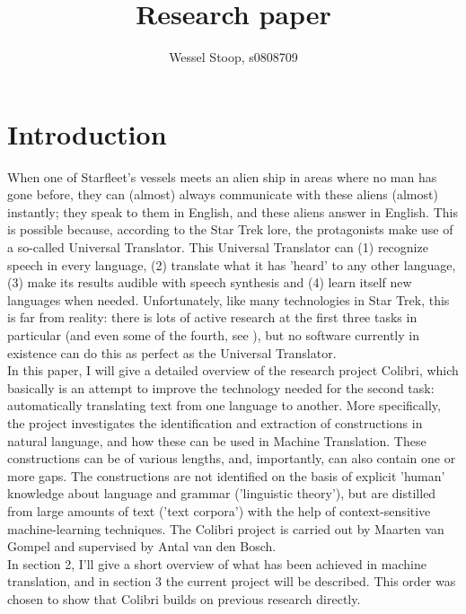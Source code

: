 \documentclass[12pt]{article}
\title{Research paper}
\author{Wessel Stoop, s0808709}
\begin{document}
\maketitle

\section{Introduction}

When one of Starfleet's vessels meets an alien ship in areas where no man has gone before, they can (almost) always communicate with these aliens (almost) instantly; they speak to them in English, and these aliens answer in English. This is possible because, according to the Star Trek lore, the protagonists make use of a so-called Universal Translator. This Universal Translator can (1) recognize speech in every language, (2) translate what it has 'heard' to any other language, (3) make its results audible with speech synthesis and (4) learn itself new languages when needed. Unfortunately, like many technologies in Star Trek, this is far from reality: there is lots of active research at the first three tasks in particular (and even some of the fourth, see \citet{biemann11}), but no software currently in existence can do this as perfect as the Universal Translator. \\\indent
In this paper, I will give a detailed overview of the research project Colibri, which basically is an attempt to improve the technology needed for the second task: automatically translating text from one language to another. More specifically, the project investigates the identification and extraction of constructions in natural language, and how these can be used in Machine Translation. These constructions can be of various lengths, and, importantly, can also contain one or more gaps. The constructions are not identified on the basis of explicit 'human' knowledge about language and grammar ('linguistic theory'), but are distilled from large amounts of text ('text corpora') with the help of context-sensitive machine-learning techniques. The Colibri project is carried out by Maarten van Gompel and supervised by Antal van den Bosch.
\\\indent
In section 2, I'll give a short overview of what has been achieved in machine translation, and in section 3 the current project will be described. This order was chosen to show that Colibri builds on previous research directly.

\end{document}
